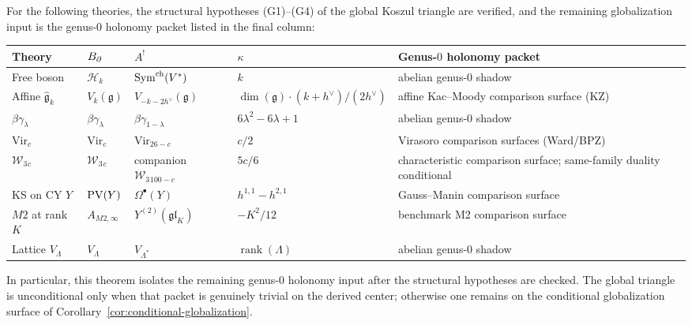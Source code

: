 \begin{theorem}
For the following theories, the structural hypotheses
\textup{(}G1\textup{)}--\textup{(}G4\textup{)} of the global
Koszul triangle are verified, and the remaining globalization
input is the genus-$0$ holonomy packet listed in the final
column:
\begin{center}
\renewcommand{\arraystretch}{1.3}
\begin{tabular}{lllll}
\textbf{Theory} & \textbf{$B_{\partial}$} & \textbf{$A^!$}
& $\kappa$ & \textbf{Genus-$0$ holonomy packet} \\
\hline
Free boson & $\mathcal{H}_k$ & $\operatorname{Sym}^{\mathrm{ch}}(V^*)$ & $k$
& abelian genus-$0$ shadow \\
Affine $\hat{\mathfrak{g}}_k$ & $V_k(\mathfrak{g})$
& $V_{-k-2h^\vee}(\mathfrak{g})$
& $\dim(\mathfrak{g})\cdot(k+h^\vee)/(2h^\vee)$
& affine Kac--Moody comparison surface \textup{(}KZ\textup{)} \\
$\beta\gamma_\lambda$ & $\beta\gamma_\lambda$
& $\beta\gamma_{1-\lambda}$ & $6\lambda^2-6\lambda+1$
& abelian genus-$0$ shadow \\
$\mathrm{Vir}_c$ & $\mathrm{Vir}_c$ & $\mathrm{Vir}_{26-c}$
& $c/2$
& Virasoro comparison surfaces \textup{(}Ward/BPZ\textup{)} \\
$\mathcal{W}_3{}_c$ & $\mathcal{W}_3{}_c$
& companion $\mathcal{W}_3{}_{100-c}$ & $5c/6$
& characteristic comparison surface; same-family duality conditional \\
KS on CY $Y$ & $\operatorname{PV}(Y)$ & $\Omega^\bullet(Y)$
& $h^{1,1}-h^{2,1}$
& Gauss--Manin comparison surface \\
$M2$ at rank $K$ & $A_{M2,\infty}$ & $Y^{(2)}(\mathfrak{gl}_K)$
& $-K^2/12$ & benchmark M2 comparison surface \\
Lattice $V_\Lambda$ & $V_\Lambda$ & $V_{\Lambda^*}$
& $\operatorname{rank}(\Lambda)$ & abelian genus-$0$ shadow
\end{tabular}
\end{center}
In particular, this theorem isolates the remaining genus-$0$
holonomy input after the structural hypotheses are checked.
The global triangle is unconditional only when that packet is
genuinely trivial on the derived center; otherwise one remains on
the conditional globalization surface of
Corollary~\ref{cor:conditional-globalization}.
\end{theorem}


